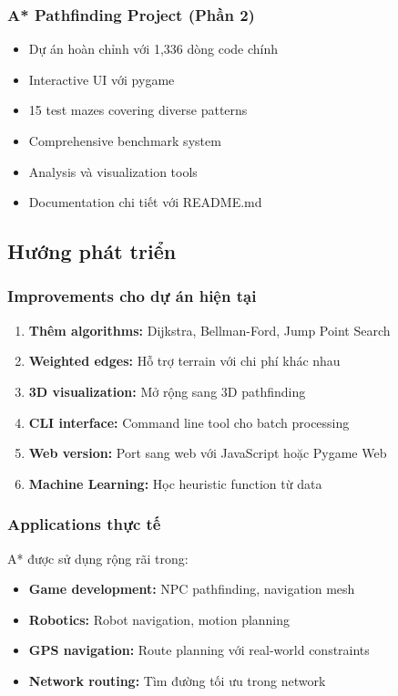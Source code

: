 \documentclass[12pt,a4paper]{article}
\begin{document}
\subsubsection{A* Pathfinding Project (Phần 2)}
\begin{itemize}
    \item Dự án hoàn chỉnh với 1,336 dòng code chính
    \item Interactive UI với pygame
    \item 15 test mazes covering diverse patterns
    \item Comprehensive benchmark system
    \item Analysis và visualization tools
    \item Documentation chi tiết với README.md
\end{itemize}

\subsection{Hướng phát triển}

\subsubsection{Improvements cho dự án hiện tại}
\begin{enumerate}
    \item \textbf{Thêm algorithms:} Dijkstra, Bellman-Ford, Jump Point Search
    \item \textbf{Weighted edges:} Hỗ trợ terrain với chi phí khác nhau
    \item \textbf{3D visualization:} Mở rộng sang 3D pathfinding
    \item \textbf{CLI interface:} Command line tool cho batch processing
    \item \textbf{Web version:} Port sang web với JavaScript hoặc Pygame Web
    \item \textbf{Machine Learning:} Học heuristic function từ data
\end{enumerate}

\subsubsection{Applications thực tế}
A* được sử dụng rộng rãi trong:
\begin{itemize}
    \item \textbf{Game development:} NPC pathfinding, navigation mesh
    \item \textbf{Robotics:} Robot navigation, motion planning
    \item \textbf{GPS navigation:} Route planning với real-world constraints
    \item \textbf{Network routing:} Tìm đường tối ưu trong network
\end{itemize}
\end{document}
